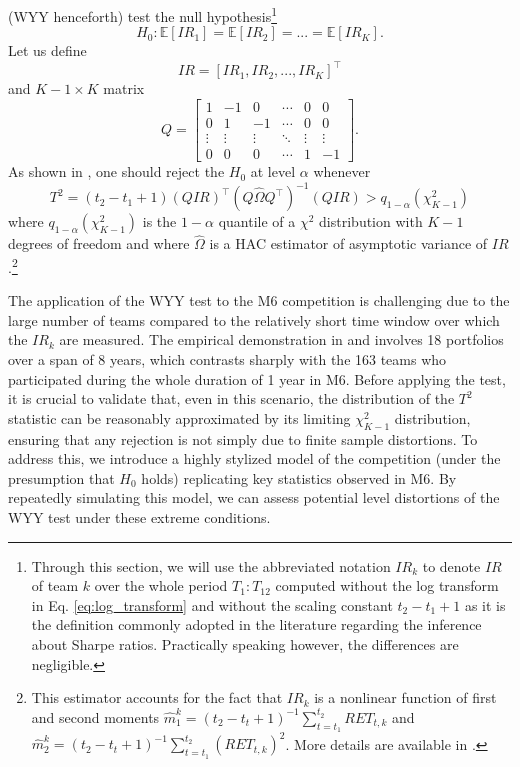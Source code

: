 \documentclass[3p,times,twocolumn]{elsarticle}
\begin{document}
\citet{wrightTestEqualityMultiple2014} (WYY henceforth) test the null hypothesis\footnote{
    Through this section, we will use the abbreviated notation $IR_{k}$ to denote $IR$ of team $k$ over the whole period $T_{1}:T_{12}$ computed without the log transform in Eq. \ref{eq:log_transform} and without the scaling constant $t_{2}-t_{1}+1$ as it is the definition commonly adopted in the literature regarding the inference about Sharpe ratios.
    Practically speaking however, the differences are negligible.
}
\begin{equation}
    H_{0}: \mathbb{E}[IR_{1}] = \mathbb{E}[IR_{2}] = ... = \mathbb{E}[IR_{K}].
\end{equation}
Let us define
\begin{equation}
    IR = [IR_{1}, IR_{2}, ... , IR_{K}]^{\top}
\end{equation}
and $K-1 \times K$ matrix
\begin{equation}
    Q = \left[ \begin{array}{cccccc}
    1 & -1 & 0 & \cdots & 0 & 0\\
    0 & 1 & -1 & \cdots & 0 & 0\\
    \vdots & \vdots & \vdots & \ddots & \vdots & \vdots \\
    0 & 0 & 0 & \cdots & 1 & -1
    \end{array} \right].
\end{equation}
As shown in \citet{wrightTestEqualityMultiple2014}, one should reject the $H_{0}$ at level $\alpha$ whenever
\begin{equation}
    T^2 = (t_{2}-t_{1}+1)(QIR)^{\top}(Q\hat{\Omega} Q^{\top})^{-1}(QIR) > q_{1-\alpha}(\chi^2_{K-1})
\end{equation}
where $q_{1-\alpha}(\chi^2_{K-1})$ is the $1-\alpha$ quantile of a $\chi^2$ distribution with $K-1$ degrees of freedom and where $\hat{\Omega}$ is a HAC estimator of asymptotic variance of $IR$.\footnote{
    This estimator accounts for the fact that $IR_{k}$ is a nonlinear function of first and second moments $\hat{m}_{1}^{k} = (t_{2}-t_{t}+1)^{-1} \sum_{t=t_{1}}^{t_{2}} RET_{t,k}$ and $\hat{m}_{2}^{k} = (t_{2}-t_{t}+1)^{-1} \sum_{t=t_{1}}^{t_{2}} (RET_{t,k})^2$.
    More details are available in \citet{wrightTestEqualityMultiple2014}.
}

The application of the WYY test to the M6 competition is challenging due to the large number of teams compared to the relatively short time window over which the $IR_{k}$ are measured.
The empirical demonstration in \citet{leungTestingEqualityMultiple2008} and \citet{wrightTestEqualityMultiple2014} involves 18 portfolios over a span of 8 years, which contrasts sharply with the 163 teams who participated during the whole duration of 1 year in M6.
Before applying the test, it is crucial to validate that, even in this scenario, the distribution of the $T^{2}$ statistic can be reasonably approximated by its limiting $\chi^{2}_{K-1}$ distribution, ensuring that any rejection is not simply due to finite sample distortions.
To address this, we introduce a highly stylized model of the competition (under the presumption that $H_{0}$ holds) replicating key statistics observed in M6.
By repeatedly simulating this model, we can assess potential level distortions of the WYY test under these extreme conditions.
\end{document}
